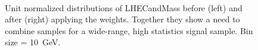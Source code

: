 \begin{figure}[htb]
    \begin{center}
        \\
    \end{center}
    \caption{Unit normalized distributions of LHECandMass before (left) and after (right) applying
        the weights. Together they show a need to combine samples for a wide-range, high
    statistics signal sample. Bin size = \SI{10}{\giga\electronvolt}.}
    \label{fig:LHE_raw}
\end{figure}

